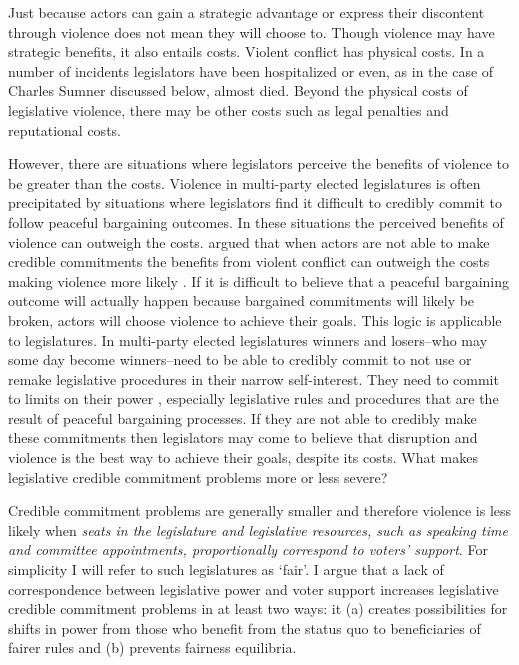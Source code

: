 \documentclass[a4paper]{article}\usepackage[]{graphicx}\usepackage[]{color}
\begin{document}
Just because actors can gain a strategic advantage or express their discontent through violence does not mean they will choose to. Though violence may have strategic benefits, it also entails costs. Violent conflict has physical costs. In a number of incidents legislators have been hospitalized or even, as in the case of Charles Sumner discussed below, almost died. Beyond the physical costs of legislative violence, there may be other costs such as legal penalties and reputational costs.

However, there are situations where legislators perceive the benefits of violence to be greater than the costs. Violence in multi-party elected legislatures is often precipitated by situations where legislators find it difficult to credibly commit to follow peaceful bargaining outcomes. In these situations the perceived benefits of violence can outweigh the costs. \cite{Fearon1995} argued that when actors are not able to make credible commitments the benefits from violent conflict can outweigh the costs making violence more likely \cite[see also][]{Powell2006}. If it is difficult to believe that a peaceful bargaining outcome will actually happen because bargained commitments will likely be broken, actors will choose violence to achieve their goals. This logic is applicable to legislatures. In multi-party elected legislatures winners and losers--who may some day become winners--need to be able to credibly commit to not use or remake legislative procedures in their narrow self-interest. They need to commit to limits on their power \citep{riker1982,Gaubatz1996}, especially legislative rules and procedures that are the result of peaceful bargaining processes. If they are not able to credibly make these commitments then legislators may come to believe that disruption and violence is the best way to achieve their goals, despite its costs. What makes legislative credible commitment problems more or less severe?

Credible commitment problems are generally smaller and therefore violence is less likely when \emph{ seats in the legislature and legislative resources, such as speaking time and committee appointments, proportionally correspond to voters' support}. For simplicity I will refer to such legislatures as `fair'. I argue that a lack of correspondence between legislative power and voter support increases legislative credible commitment problems in at least two ways: it (a) creates possibilities for shifts in power from those who benefit from the status quo to beneficiaries of fairer rules and (b) prevents fairness equilibria.
\end{document}
